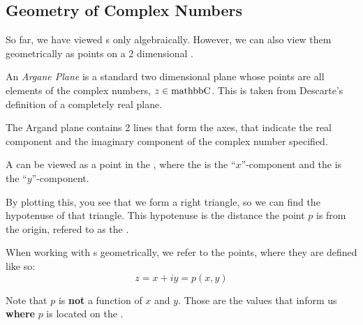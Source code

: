 \subsection{Geometry of Complex Numbers}\label{subsec:Geometry_Complex_Numbers}
So far, we have viewed s only algebraically.
However, we can also view them geometrically as points on a 2 dimensional .

\begin{definition}\label{def:Argand_Plane}
  An \emph{Argane Plane} is a standard two dimensional plane whose points are all elements of the complex numbers, $z \in \operatorname{mathbb{C}}$.
  This is taken from Descarte's definition of a completely real plane.

  The Argand plane contains 2 lines that form the axes, that indicate the real component and the imaginary component of the complex number specified.
\end{definition}

A  can be viewed as a point in the , where the  is the ``$x$''-component and the  is the ``$y$''-component.

By plotting this, you see that we form a right triangle, so we can find the hypotenuse of that triangle.
This hypotenuse is the distance the point $p$ is from the origin, refered to as the .
\begin{remark*}
  When working with s geometrically, we refer to the points, where they are defined like so:
  \begin{equation*}
    z = x + iy = p(x, y)
  \end{equation*}

  Note that $p$ is \textbf{not} a function of $x$ and $y$.
  Those are the values that inform us \textbf{where} $p$ is located on the .
\end{remark*}


